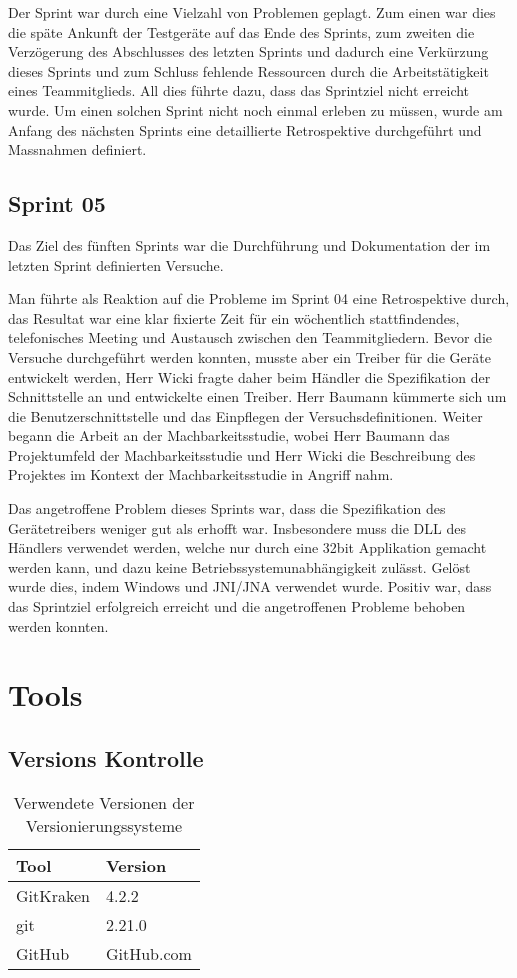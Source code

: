 Der Sprint war durch eine Vielzahl von Problemen geplagt. Zum einen war dies die späte Ankunft der Testgeräte auf das Ende des Sprints, zum zweiten die Verzögerung des Abschlusses des letzten Sprints und dadurch eine Verkürzung dieses Sprints und zum Schluss fehlende Ressourcen durch die Arbeitstätigkeit eines Teammitglieds. All dies führte dazu, dass das Sprintziel nicht erreicht wurde. Um einen solchen Sprint nicht noch einmal erleben zu müssen, wurde am Anfang des nächsten Sprints eine detaillierte Retrospektive durchgeführt und Massnahmen definiert.

\subsection{Sprint 05}
Das Ziel des fünften Sprints war die Durchführung und Dokumentation der im letzten Sprint definierten Versuche.

Man führte als Reaktion auf die Probleme im Sprint 04 eine Retrospektive durch, das Resultat war eine klar fixierte Zeit für ein wöchentlich stattfindendes, telefonisches Meeting und Austausch zwischen den Teammitgliedern. Bevor die Versuche durchgeführt werden konnten, musste aber ein Treiber für die Geräte entwickelt werden, Herr Wicki fragte daher beim Händler die Spezifikation der Schnittstelle an und entwickelte einen Treiber. Herr Baumann kümmerte sich um die Benutzerschnittstelle und das Einpflegen der Versuchsdefinitionen. Weiter begann die Arbeit an der Machbarkeitsstudie, wobei Herr Baumann das Projektumfeld der Machbarkeitsstudie und Herr Wicki die Beschreibung des Projektes im Kontext der Machbarkeitsstudie in Angriff nahm.

Das angetroffene Problem dieses Sprints war, dass die Spezifikation des Gerätetreibers weniger gut als erhofft war. Insbesondere muss die DLL des Händlers verwendet werden, welche nur durch eine 32bit Applikation gemacht werden kann, und dazu keine Betriebssystemunabhängigkeit zulässt. Gelöst wurde dies, indem Windows und JNI/JNA verwendet wurde. Positiv war, dass das Sprintziel erfolgreich erreicht und die angetroffenen Probleme behoben werden konnten.

\newpage

\section{Tools}
\label{sec:Tools}

\subsection{Versions Kontrolle}
\begin{table}[h!]
	\begin{tabular}{p{} p{}}
		\hline
		\textbf{Tool} & \textbf{Version} \\
		\hline
		GitKraken & 4.2.2 \\
		\hline
		git & 2.21.0 \\
		\hline
		GitHub & GitHub.com \\
		\hline
	\end{tabular}
	\caption{Verwendete Versionen der Versionierungssysteme}
\end{table}

